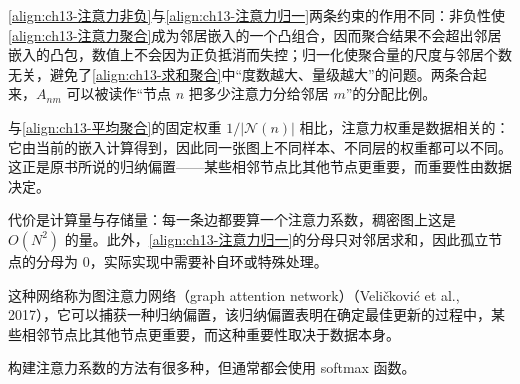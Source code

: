 \documentclass[../../main.tex]{subfiles}
\begin{document}
\begin{remark}
\eqref{align:ch13-注意力非负}与\eqref{align:ch13-注意力归一}两条约束的作用不同：非负性使\eqref{align:ch13-注意力聚合}成为邻居嵌入的一个凸组合，因而聚合结果不会超出邻居嵌入的凸包，数值上不会因为正负抵消而失控；归一化使聚合量的尺度与邻居个数无关，避免了\eqref{align:ch13-求和聚合}中“度数越大、量级越大”的问题。两条合起来，$A_{nm}$ 可以被读作“节点 $n$ 把多少注意力分给邻居 $m$”的分配比例。\par
与\eqref{align:ch13-平均聚合}的固定权重 $1/|\mathcal{N}(n)|$ 相比，注意力权重是数据相关的：它由当前的嵌入计算得到，因此同一张图上不同样本、不同层的权重都可以不同。这正是原书所说的归纳偏置——某些相邻节点比其他节点更重要，而重要性由数据决定。\par
代价是计算量与存储量：每一条边都要算一个注意力系数，稠密图上这是 $O(N^2)$ 的量。此外，\eqref{align:ch13-注意力归一}的分母只对邻居求和，因此孤立节点的分母为 $0$，实际实现中需要补自环或特殊处理。
\end{remark}

这种网络称为图注意力网络（graph attention network）（Veličković et al., 2017），它可以捕获一种归纳偏置，该归纳偏置表明在确定最佳更新的过程中，某些相邻节点比其他节点更重要，而这种重要性取决于数据本身。

构建注意力系数的方法有很多种，但通常都会使用 softmax 函数。
\end{document}
